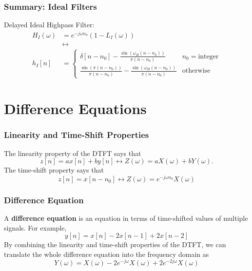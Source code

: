 \documentclass{beamer}
\begin{document}
\begin{frame}
  \frametitle{Summary: Ideal Filters}
  Delayed Ideal Highpass Filter:
  \begin{align*}
    H_I(\omega)&=e^{-j\omega n_0}\left(1-L_I(\omega)\right)\\
    &\leftrightarrow\\
    h_I[n]&=\begin{cases}
    \delta[n-n_0]-\frac{\sin(\omega_H (n-n_0))}{\pi (n-n_0)} & n_0=\mbox{integer}\\
    \frac{\sin(\pi (n-n_0))}{\pi (n-n_0)}-\frac{\sin(\omega_H (n-n_0))}{\pi (n-n_0)} & \mbox{otherwise}
    \end{cases}
  \end{align*}
\end{frame}

\section{Difference Equations}
\setcounter{subsection}{1}

\begin{frame}
  \frametitle{Linearity and Time-Shift Properties}

  The linearity property of the DTFT says that
  \[
  z[n]= ax[n]+by[n]\leftrightarrow Z(\omega) = aX(\omega)+bY(\omega).
  \]
  The time-shift property says that
  \[
  z[n]= x[n-n_0] \leftrightarrow Z(\omega) = e^{-j\omega n_0} X(\omega)
  \]
\end{frame}

\begin{frame}
  \frametitle{Difference Equation}

  A {\bf difference equation} is an equation in terms of time-shifted
  values of multiple signals.  For example,
  \[
  y[n] = x[n] - 2x[n-1] + 2x[n-2]
  \]
  By combining the linearity and time-shift properties of the DTFT, we
  can translate the whole difference equation into the frequency
  domain as
  \[
  Y(\omega)  = X(\omega) -2e^{-j\omega} X(\omega) + 2 e^{-2j\omega}X(\omega)
  \]
\end{frame}
\end{document}
